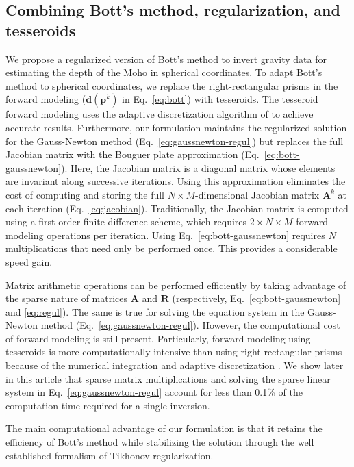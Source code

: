 \documentclass[extra,mreferee]{gji}
\begin{document}
\subsection{Combining Bott's method, regularization, and tesseroids}

We propose a regularized version of Bott's method to invert gravity data for
estimating the depth of the Moho in spherical coordinates.
To adapt Bott's method to spherical coordinates,
we replace the right-rectangular prisms in the forward modeling
($\mathbf{d}(\mathbf{p}^k)$ in Eq.~\ref{eq:bott})
with tesseroids.
The tesseroid forward modeling uses the adaptive discretization algorithm
of \citet{uieda2016} to achieve accurate results.
Furthermore, our formulation maintains the regularized solution
for the Gauss-Newton method (Eq.~\ref{eq:gaussnewton-regul})
but replaces the full Jacobian matrix with the Bouguer plate approximation
(Eq.~\ref{eq:bott-gaussnewton}).
Here, the Jacobian matrix is a diagonal matrix whose elements are invariant
along successive iterations.
Using this approximation eliminates the cost of computing and storing
the full $N \times M$-dimensional Jacobian matrix $\mathbf{A}^k$ at each
iteration
(Eq.~\ref{eq:jacobian}).
Traditionally, the Jacobian matrix is computed using a first-order finite
difference scheme,
which requires $2 \times N \times M$ forward modeling operations per iteration.
Using Eq.~\ref{eq:bott-gaussnewton} requires $N$ multiplications that need only
be performed once.
This provides a considerable speed gain.

Matrix arithmetic operations can be performed efficiently by taking advantage
of the sparse nature of matrices $\mathbf{A}$ and $\mathbf{R}$
(respectively, Eq.~\ref{eq:bott-gaussnewton} and \ref{eq:regul}).
The same is true for solving the equation system in the Gauss-Newton method
(Eq.~\ref{eq:gaussnewton-regul}).
However, the computational cost of forward modeling is still present.
Particularly, forward modeling using tesseroids is more computationally
intensive than using right-rectangular prisms
because of the numerical integration and adaptive discretization
\citep{uieda2016}.
We show later in this article that sparse matrix multiplications and solving
the sparse linear system in Eq.~\ref{eq:gaussnewton-regul} account for less
than 0.1\% of the computation time required for a single inversion.

The main computational advantage of our formulation is that it retains the
efficiency of Bott's method while stabilizing the solution through the well
established formalism of Tikhonov regularization.
\end{document}
